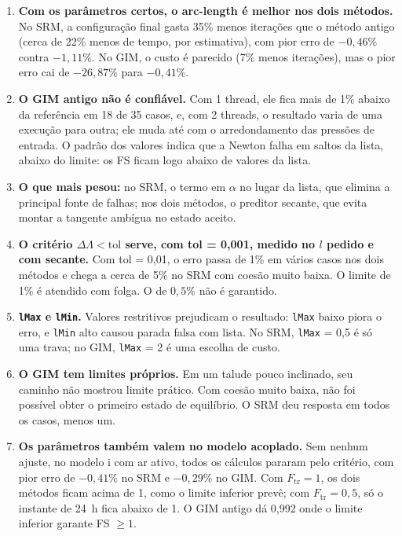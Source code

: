 \documentclass[11pt,a4paper]{article}
\numberwithin{equation}{section}
\begin{document}
\begin{enumerate}
\item \textbf{Com os parâmetros certos, o arc-length é melhor nos dois métodos.} No SRM, a configuração final gasta 35\% menos iterações que o método antigo (cerca de 22\% menos de tempo, por estimativa), com pior erro de $-0{,}46\%$ contra $-1{,}11\%$. No GIM, o custo é parecido (7\% menos iterações), mas o pior erro cai de $-26{,}87\%$ para $-0{,}41\%$.
\item \textbf{O GIM antigo não é confiável.} Com 1 thread, ele fica mais de 1\% abaixo da referência em 18 de 35 casos, e, com 2 threads, o resultado varia de uma execução para outra; ele muda até com o arredondamento das pressões de entrada. O padrão dos valores indica que a Newton falha em saltos da lista, abaixo do limite: os FS ficam logo abaixo de valores da lista.
\item \textbf{O que mais pesou:} no SRM, o termo em $\alpha$ no lugar da lista, que elimina a principal fonte de falhas; nos dois métodos, o preditor secante, que evita montar a tangente ambígua no estado aceito.
\item \textbf{O critério $\Delta\Lambda < \mathrm{tol}$ serve, com tol = 0,001, medido no $l$ pedido e com secante.} Com tol = 0,01, o erro passa de 1\% em vários casos nos dois métodos e chega a cerca de 5\% no SRM com coesão muito baixa. O limite de 1\% é atendido com folga. O de $0{,}5\%$ não é garantido.
\item \textbf{\texttt{lMax} e \texttt{lMin}.} Valores restritivos prejudicam o resultado: \texttt{lMax} baixo piora o erro, e \texttt{lMin} alto causou parada falsa com lista. No SRM, \texttt{lMax} = 0,5 é só uma trava; no GIM, \texttt{lMax} = 2 é uma escolha de custo.
\item \textbf{O GIM tem limites próprios.} Em um talude pouco inclinado, seu caminho não mostrou limite prático. Com coesão muito baixa, não foi possível obter o primeiro estado de equilíbrio. O SRM deu resposta em todos os casos, menos um.
\item \textbf{Os parâmetros também valem no modelo acoplado.} Sem nenhum ajuste, no modelo i com ar ativo, todos os cálculos pararam pelo critério, com pior erro de $-0{,}41\%$ no SRM e $-0{,}29\%$ no GIM. Com $F_{\mathrm{tr}} = 1$, os dois métodos ficam acima de 1, como o limite inferior prevê; com $F_{\mathrm{tr}} = 0{,}5$, só o instante de 24~h fica abaixo de 1. O GIM antigo dá 0,992 onde o limite inferior garante FS $\ge 1$.
\end{enumerate}
\end{document}
